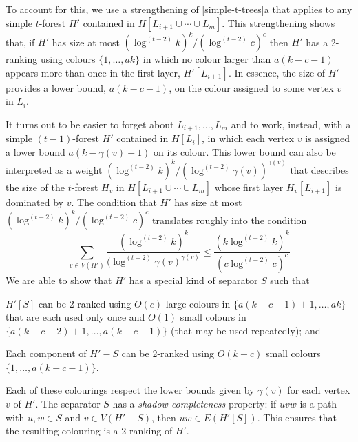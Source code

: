 \documentclass[kpfonts]{patmorin}
\theoremstyle{named}
\newcommand{\weirdref}[2]{\cref{#1}#2}
\begin{document}
To account for this, we use a strengthening of \weirdref{simple-t-trees}{a} that applies to any simple $t$-forest $H'$ contained in $H[L_{i+1}\cup\cdots\cup L_m]$.  This strengthening shows that, if $H'$ has size at most $(\log^{(t-2)} k)^k/(\log^{(t-2)} c)^c$ then $H'$ has a 2-ranking using colours $\{1,\ldots,ak\}$ in which no colour larger than $a(k-c-1)$ appears more than once in the first layer, $H'[L_{i+1}]$.  In essence, the size of $H'$ provides a lower bound, $a(k-c-1)$, on the colour assigned to some vertex $v$ in $L_i$.

It turns out to be easier to forget about $L_{i+1},\ldots,L_{m}$ and to work, instead, with a simple $(t-1)$-forest $H'$ contained in $H[L_i]$, in which each vertex $v$ is assigned a lower bound $a(k-\gamma(v)-1)$ on its colour.  This lower bound can also be interpreted as a weight  $(\log^{(t-2)}k)^k/(\log^{(t-2)}\gamma(v))^{\gamma(v)}$ that describes the size of the $t$-forest $H_v$ in $H[L_{i+1}\cup\cdots\cup L_m]$ whose first layer $H_v[L_{i+1}]$ is dominated by $v$.  The condition that $H'$ has size at most $(\log^{(t-2)} k)^k/(\log^{(t-2)} c)^c$ translates roughly into the condition
\[
   \sum_{v\in V(H')}\frac{(\log^{(t-2)}k)^k}{(\log^{(t-2)}\gamma(v)^{\gamma(v)}} \le \frac{(k\log^{(t-2)} k)^k}{(c\log^{(t-2)} c)^c}
\]
We are able to show that $H'$ has a special kind of separator $S$ such that
\begin{compactenum}
    \item $H'[S]$ can be 2-ranked using $O(c)$ large colours in $\{a(k-c-1)+1,\ldots,ak\}$ that are each used only once and $O(1)$ small colours in $\{a(k-c-2)+1,\ldots,a(k-c-1)\}$ (that may be used repeatedly); and
    \item Each component of $H'-S$ can be 2-ranked using $O(k-c)$ small colours $\{1,\ldots,a(k-c-1)\}$.
\end{compactenum}
Each of these colourings respect the lower bounds given by $\gamma(v)$ for each vertex $v$ of $H'$.  The separator $S$ has a \emph{shadow-completeness} property: if $uvw$ is a path with $u,w\in S$ and $v\in V(H'-S)$, then $uw\in E(H'[S])$.  This ensures that the resulting colouring is a 2-ranking of $H'$.
\end{document}
